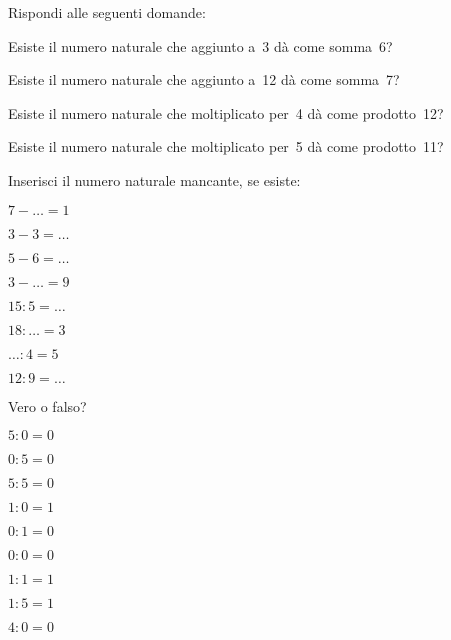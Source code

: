 \begin{esercizio}
\label{ese:1.1}
Rispondi alle seguenti domande:
 \begin{enumeratea}
 \item Esiste il numero naturale che aggiunto a~3 dà come somma~6?
 \item Esiste il numero naturale che aggiunto a~12 dà come somma~7?
 \item Esiste il numero naturale che moltiplicato per~4 dà come prodotto~12?
 \item Esiste il numero naturale che moltiplicato per~5 dà come prodotto~11?
 \end{enumeratea}
\end{esercizio}

\begin{esercizio}
\label{ese:1.2}
 Inserisci il numero naturale mancante, se esiste:
\begin{multicols}{4}
\begin{enumeratea}
 \item \(7-\ldots =1\)
 \item\(3-3=\ldots~\)
 \item\(5-6=\ldots~\)
 \item \(3-\ldots =9\)
 \item\(15:5=\ldots~\)
 \item\(18:\ldots =3\)
 \item \(\ldots:4=5\)
 \item\(12:9=\ldots~\)
\end{enumeratea}
\end{multicols}
\end{esercizio}

\begin{esercizio}
\label{ese:1.3}
 Vero o falso?
\begin{multicols}{3}
\begin{enumeratea}
 \item \(5:0=0\)	\tab\boxV\quad\boxF
 \item \(0:5=0\)	\tab\boxV\quad\boxF
 \item \(5:5=0\)	\tab\boxV\quad\boxF
 \item \(1:0=1\)	\tab\boxV\quad\boxF
 \item \(0:1=0\)	\tab\boxV\quad\boxF
 \item \(0:0=0\)	\tab\boxV\quad\boxF
 \item \(1:1=1\)	\tab\boxV\quad\boxF
 \item \(1:5=1\)	\tab\boxV\quad\boxF
 \item \(4:0=0\)  \tab\boxV\quad\boxF
\end{enumeratea}
\end{multicols}
\end{esercizio}

